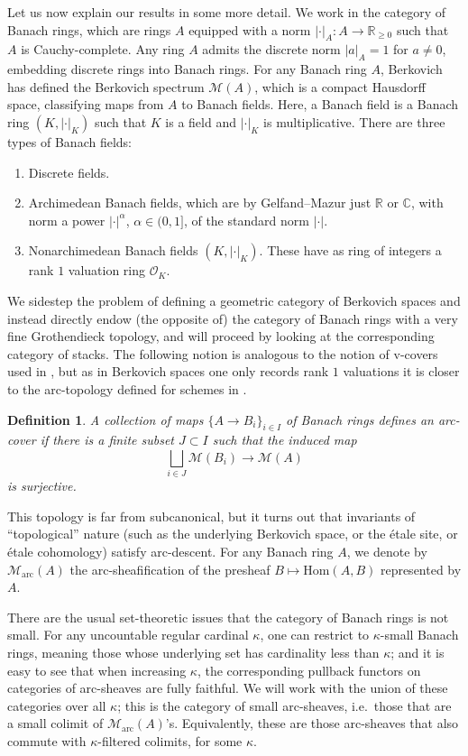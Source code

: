 \documentclass[11pt]{amsart}
\numberwithin{equation}{section}
\numberwithin{theorem}{section}
\newtheorem{definition}[theorem]{Definition}
\theoremstyle{definition}
\begin{document}
Let us now explain our results in some more detail. We work in the category of Banach rings, which are rings $A$ equipped with a norm $|\cdot|_A: A\to \mathbb R_{\geq 0}$ such that $A$ is Cauchy-complete. Any ring $A$ admits the discrete norm $|a|_A = 1$ for $a\neq 0$, embedding discrete rings into Banach rings. For any Banach ring $A$, Berkovich has defined the Berkovich spectrum $\mathcal M(A)$, which is a compact Hausdorff space, classifying maps from $A$ to Banach fields. Here, a Banach field is a Banach ring $(K,|\cdot|_K)$ such that $K$ is a field and $|\cdot|_K$ is multiplicative. There are three types of Banach fields:
\begin{enumerate}
\item[{\rm (1)}] Discrete fields.
\item[{\rm (2)}] Archimedean Banach fields, which are by Gelfand--Mazur just $\mathbb R$ or $\mathbb C$, with norm a power $|\cdot|^\alpha$, $\alpha\in (0,1]$, of the standard norm $|\cdot|$.
\item[{\rm (3)}] Nonarchimedean Banach fields $(K,|\cdot|_K)$. These have as ring of integers a rank $1$ valuation ring $\mathcal O_K$.
\end{enumerate}

We sidestep the problem of defining a geometric category of Berkovich spaces and instead directly endow (the opposite of) the category of Banach rings with a very fine Grothendieck topology, and will proceed by looking at the corresponding category of stacks. The following notion is analogous to the notion of v-covers used in \cite{ECoD}, but as in Berkovich spaces one only records rank $1$ valuations it is closer to the arc-topology defined for schemes in \cite{BhattMathew}.

\begin{definition} A collection of maps $\{A\to B_i\}_{i\in I}$ of Banach rings defines an arc-cover if there is a finite subset $J\subset I$ such that the induced map
\[
\bigsqcup_{i\in J} \mathcal M(B_i)\to \mathcal M(A)
\]
is surjective.
\end{definition}

This topology is far from subcanonical, but it turns out that invariants of ``topological'' nature (such as the underlying Berkovich space, or the \'etale site, or \'etale cohomology) satisfy arc-descent. For any Banach ring $A$, we denote by $\mathcal M_{\mathrm{arc}}(A)$ the arc-sheafification of the presheaf $B\mapsto \mathrm{Hom}(A,B)$ represented by $A$.

There are the usual set-theoretic issues that the category of Banach rings is not small. For any uncountable regular cardinal $\kappa$, one can restrict to $\kappa$-small Banach rings, meaning those whose underlying set has cardinality less than $\kappa$; and it is easy to see that when increasing $\kappa$, the corresponding pullback functors on categories of arc-sheaves are fully faithful. We will work with the union of these categories over all $\kappa$; this is the category of small arc-sheaves, i.e.~those that are a small colimit of $\mathcal M_{\mathrm{arc}}(A)$'s. Equivalently, these are those arc-sheaves that also commute with $\kappa$-filtered colimits, for some $\kappa$.
\end{document}
